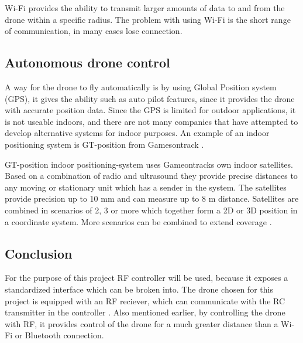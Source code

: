 Wi-Fi provides the ability to transmit larger amounts of data to and from the drone within a specific radius. The problem with using Wi-Fi is the short range of communication, in many cases lose connection. 

\subsection*{Autonomous drone control}
A way for the drone to fly automatically is by using Global Position system (GPS), it gives the ability such as auto pilot features, since it provides the drone with accurate position data.
Since the GPS is limited for outdoor applications, it is not useable indoors, and there are not many companies that have attempted to develop alternative systems for indoor purposes. An example of an indoor positioning system is GT-position from Gamesontrack \cite{gt-position}. 

GT-position indoor positioning-system uses Gameontracks own indoor satellites.
Based on a combination of radio and ultrasound they provide precise distances to any moving or stationary unit which has a sender in the system.
The satellites provide precision up to 10 mm and can measure up to 8 m distance. Satellites are combined in scenarios of 2, 3 or more which together form a 2D or 3D position in a coordinate system. More scenarios can be combined to extend coverage \cite{gt-position}.

\subsection*{Conclusion} 
For the purpose of this project RF controller will be used, because it exposes a standardized interface which can be broken into. The drone chosen for this project is equipped with an RF reciever, which can communicate with the RC transmitter in the controller \cite{Control}. Also mentioned earlier, by controlling the drone with RF, it provides control of the drone for a much greater distance than a Wi-Fi or Bluetooth connection.











